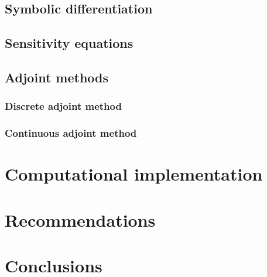 \documentclass[12pt]{article}
\begin{document}
\subsection{Symbolic differentiation}


\subsection{Sensitivity equations}


\subsection{Adjoint methods}
\label{section:adjoint-methods}


\subsubsection{Discrete adjoint method}


\subsubsection{Continuous adjoint method}


\section{Computational implementation}
\label{sec:computational-implementation}


\section{Recommendations}


\section{Conclusions}



\end{document}
